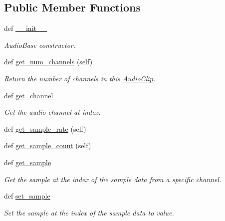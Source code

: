 \subsection*{Public Member Functions}
\begin{DoxyCompactItemize}
\item 
def \hyperlink{classbridges_1_1audio__clip_1_1_audio_clip_aa159be044564628f5c87dc1e988e2b4e}{\+\_\+\+\_\+init\+\_\+\+\_\+}
\begin{DoxyCompactList}\small\item\em Audio\+Base constructor. \end{DoxyCompactList}\item 
def \hyperlink{classbridges_1_1audio__clip_1_1_audio_clip_af881900e292374fabf1f53a253571e5f}{get\+\_\+num\+\_\+channels} (self)
\begin{DoxyCompactList}\small\item\em Return the number of channels in this \hyperlink{classbridges_1_1audio__clip_1_1_audio_clip}{Audio\+Clip}. \end{DoxyCompactList}\item 
def \hyperlink{classbridges_1_1audio__clip_1_1_audio_clip_a9e322508117351585d6f3d22e2ccb3bc}{get\+\_\+channel}
\begin{DoxyCompactList}\small\item\em Get the audio channel at index. \end{DoxyCompactList}\item 
def \hyperlink{classbridges_1_1audio__clip_1_1_audio_clip_a6e9cad3d81f39b3fe811307f024fa713}{get\+\_\+sample\+\_\+rate} (self)
\item 
def \hyperlink{classbridges_1_1audio__clip_1_1_audio_clip_ace0227160e6743e8fd19c803af81d474}{get\+\_\+sample\+\_\+count} (self)
\item 
def \hyperlink{classbridges_1_1audio__clip_1_1_audio_clip_a6ebead4b2cbd7c5d39c3d67775013ac4}{get\+\_\+sample}
\begin{DoxyCompactList}\small\item\em Get the sample at the index of the sample data from a specific channel. \end{DoxyCompactList}\item 
def \hyperlink{classbridges_1_1audio__clip_1_1_audio_clip_af9b9e0b615ada4a6802121f59af3da89}{set\+\_\+sample}
\begin{DoxyCompactList}\small\item\em Set the sample at the index of the sample data to value. \end{DoxyCompactList}\item 

\end{DoxyCompactItemize}
